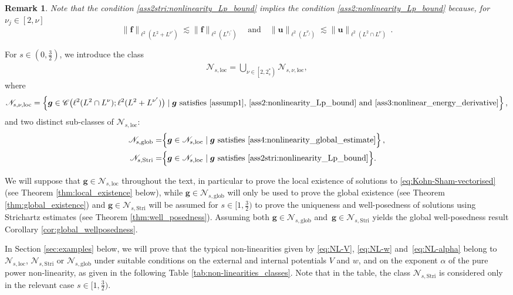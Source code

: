 \documentclass[12pt,a4paper]{amsart}
\newtheorem{remark}[theorem]{Remark}
\numberwithin{equation}{section}
\newcommand{\ulu}{\boldsymbol{u}}
\newcommand{\ulg}{\boldsymbol{g}}
\newcommand{\ulf}{\boldsymbol{f}}
\newcommand{\twoasts}{{2^*_s}}
\newcommand{\Nloc}{\mathscr{N}_{s,\mathrm{loc}}}
\newcommand{\Nlocnu}{\mathscr{N}_{s,\nu,\mathrm{loc}}}
\newcommand{\Nglob}{\mathscr{N}_{s,\mathrm{glob}}}
\newcommand{\NStri}{\mathscr{N}_{s,\mathrm{Stri}}}
\begin{document}
	\begin{remark}\label{rmk:N2prime_implies_N2}
		Note that the condition \ref{ass2stri:nonlinearity_Lp_bound} implies the condition \ref{ass2:nonlinearity_Lp_bound} because, for $\nu_j \in [2,\nu]$
		\begin{equation}
			\|\ulf\|_{\ell^2(L^2+L^{\nu'})} \lesssim \|\ulf\|_{\ell^2(L^{\nu_j'})} \quad \text{and}\quad \|\ulu\|_{\ell^2( L^{\nu_j})} \lesssim \|\ulu\|_{\ell^2(L^2\cap L^\nu)}\,.
		\end{equation}
	\end{remark}
	For $s\in(0,\frac32)$, we introduce the class
	\begin{align*}
		\Nloc =   \bigcup_{\nu \in \left[2, \twoasts \right)} \Nlocnu,
	\end{align*}
	where
	\begin{align*}
		\Nlocnu =  \left\{\ulg\in\mathscr{C}\big(\ell^2(L^2\cap L^{\nu});\ell^2(L^2+L^{\nu'})\big)
		\mid
		\ulg \text{ satisfies \ref{assump1}, \ref{ass2:nonlinearity_Lp_bound} and  \ref{ass3:nonlinear_energy_derivative}}\right\},
	\end{align*}
	and two distinct sub-classes of $\Nloc$:
	\begin{align}
		\Nglob = & \Big\{\ulg\in\Nloc \mid \ulg \text{ satisfies \ref{ass4:nonlinearity_global_estimate}}  \Big\}\,, \\
		\NStri = & \Big\{ \ulg \in \Nloc \mid \ulg \text{ satisfies \ref{ass2stri:nonlinearity_Lp_bound}} \Big\} .
	\end{align}
	
	We will suppose that $\ulg\in\Nloc$ throughout the text, in particular to prove the local existence of solutions to \eqref{eq:Kohn-Sham-vectorised} (see Theorem \ref{thm:local_existence} below), while $\ulg\in\Nglob$ will only be used to prove the global existence (see Theorem \ref{thm:global_existence}) and $\ulg \in \NStri $ will be assumed for $s \in [1,\frac32) $ to prove the uniqueness and well-posedness of solutions using Strichartz estimates (see Theorem \ref{thm:well_posedness}). Assuming both $ \ulg\in\Nglob $ and~$ \ulg \in \NStri $ yields the global well-posedness result Corollary \ref{cor:global_wellposedness}.
	
	
	In Section \ref{sec:examples} below, we will prove that the typical non-linearities given by \eqref{eq:NL-V}, \eqref{eq:NL-w} and~\eqref{eq:NL-alpha} belong to $\Nloc$, $\NStri$ or $\Nglob$ under suitable conditions on the external and internal potentials $V$ and $w$, and on the exponent $\alpha$ of the pure power non-linearity, as given in the following Table \ref{tab:non-linearities_classes}. Note that in the table, the class $\NStri$ is considered only in the relevant case $s \in [1,\tfrac{3}{2})$. 
	
\end{document}

